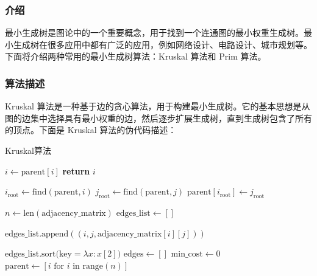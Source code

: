 \documentclass[lang=cn,11pt,a4paper]{elegantpaper}
\begin{document}
\subsubsection{介绍}
最小生成树是图论中的一个重要概念，用于找到一个连通图的最小权重生成树。最小生成树在很多应用中都有广泛的应用，例如网络设计、电路设计、城市规划等。下面将介绍两种常用的最小生成树算法：Kruskal 算法和 Prim 算法。

\subsubsection{算法描述}
Kruskal 算法是一种基于边的贪心算法，用于构建最小生成树。它的基本思想是从图的边集中选择具有最小权重的边，然后逐步扩展生成树，直到生成树包含了所有的顶点。下面是 Kruskal 算法的伪代码描述：

\begin{algorithm}[H]
\caption{Kruskal算法}
\begin{algorithmic}[1]
                \State $i \gets \text{parent}[i]$
            \EndWhile
            \State \textbf{return} $i$
        \EndFunction
        
            \State $i_{\text{root}} \gets \text{find}(\text{parent}, i)$
            \State $j_{\text{root}} \gets \text{find}(\text{parent}, j)$
                \State $\text{parent}[i_{\text{root}}] \gets j_{\text{root}}$
            \EndIf
        \EndProcedure
        
        \State $n \gets \text{len}(\text{adjacency\_matrix})$
        \State $\text{edges\_list} \gets []$
        
                    \State $\text{edges\_list.append}((i, j, \text{adjacency\_matrix}[i][j]))$
                \EndIf
            \EndFor
        \EndFor
        
        \State $\text{edges\_list.sort(key}=\lambda x: x[2])$
        \State $\text{edges} \gets []$
        \State $\text{min\_cost} \gets 0$
        \State $\text{parent} \gets [i \text{ for } i \text{ in range}(n)]$
        

\end{algorithmic}
\end{algorithm}
\end{document}
